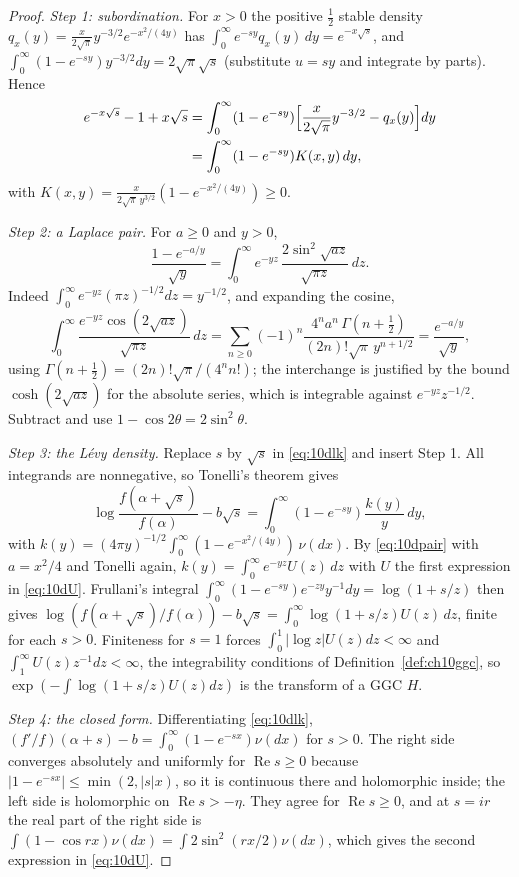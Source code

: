 \begin{proof}
\emph{Step 1: subordination.} For $x>0$ the positive $\frac12$ stable density $q_x(y) = \frac x{2\sqrt\pi}y^{-3/2}e^{-x^2/(4y)}$ has $\int_0^\infty e^{-sy}q_x(y)\,dy = e^{-x\sqrt s}$, and $\int_0^\infty(1-e^{-sy})y^{-3/2}dy = 2\sqrt\pi\sqrt s$ (substitute $u = sy$ and integrate by parts). Hence
\begin{align*}
e^{-x\sqrt s}-1+x\sqrt s &= \int_0^\infty(1-e^{-sy})\Bigl[\frac x{2\sqrt\pi}y^{-3/2}-q_x(y)\Bigr]dy\\
&= \int_0^\infty(1-e^{-sy})K(x,y)\,dy,
\end{align*}
with $K(x,y) = \frac x{2\sqrt\pi\,y^{3/2}}(1-e^{-x^2/(4y)})\ge0$.

\emph{Step 2: a Laplace pair.} For $a\ge0$ and $y>0$,
\begin{equation}\label{eq:10dpair}
\frac{1-e^{-a/y}}{\sqrt y} = \int_0^\infty e^{-yz}\,\frac{2\sin^2\sqrt{az}}{\sqrt{\pi z}}\,dz .
\end{equation}
Indeed $\int_0^\infty e^{-yz}(\pi z)^{-1/2}dz = y^{-1/2}$, and expanding the cosine,
\[
\int_0^\infty\frac{e^{-yz}\cos(2\sqrt{az})}{\sqrt{\pi z}}\,dz = \sum_{n\ge0}(-1)^n\frac{4^na^n\,\Gamma(n+\frac12)}{(2n)!\sqrt\pi\,y^{n+1/2}} = \frac{e^{-a/y}}{\sqrt y},
\]
using $\Gamma(n+\frac12) = (2n)!\sqrt\pi/(4^nn!)$; the interchange is justified by the bound $\cosh(2\sqrt{az})$ for the absolute series, which is integrable against $e^{-yz}z^{-1/2}$. Subtract and use $1-\cos2\theta = 2\sin^2\theta$.

\emph{Step 3: the L\'evy density.} Replace $s$ by $\sqrt s$ in \eqref{eq:10dlk} and insert Step 1. All integrands are nonnegative, so Tonelli's theorem gives
\[
\log\frac{f(\alpha+\sqrt s)}{f(\alpha)}-b\sqrt s = \int_0^\infty(1-e^{-sy})\frac{k(y)}y\,dy,
\]
with $k(y) = (4\pi y)^{-1/2}\int_0^\infty(1-e^{-x^2/(4y)})\,\nu(dx)$. By \eqref{eq:10dpair} with $a = x^2/4$ and Tonelli again, $k(y) = \int_0^\infty e^{-yz}U(z)\,dz$ with $U$ the first expression in \eqref{eq:10dU}. Frullani's integral $\int_0^\infty(1-e^{-sy})e^{-zy}y^{-1}dy = \log(1+s/z)$ then gives $\log(f(\alpha+\sqrt s)/f(\alpha))-b\sqrt s = \int_0^\infty\log(1+s/z)U(z)\,dz$, finite for each $s>0$. Finiteness for $s=1$ forces $\int_0^1|\log z|U(z)dz<\infty$ and $\int_1^\infty U(z)z^{-1}dz<\infty$, the integrability conditions of Definition~\ref{def:ch10ggc}, so $\exp(-\int\log(1+s/z)U(z)dz)$ is the transform of a GGC $H$.

\emph{Step 4: the closed form.} Differentiating \eqref{eq:10dlk}, $(f'/f)(\alpha+s)-b = \int_0^\infty(1-e^{-sx})\nu(dx)$ for $s>0$. The right side converges absolutely and uniformly for $\operatorname{Re}s\ge0$ because $|1-e^{-sx}|\le\min(2,|s|x)$, so it is continuous there and holomorphic inside; the left side is holomorphic on $\operatorname{Re}s>-\eta$. They agree for $\operatorname{Re}s\ge0$, and at $s = ir$ the real part of the right side is $\int(1-\cos rx)\nu(dx) = \int2\sin^2(rx/2)\nu(dx)$, which gives the second expression in \eqref{eq:10dU}.


\end{proof}
